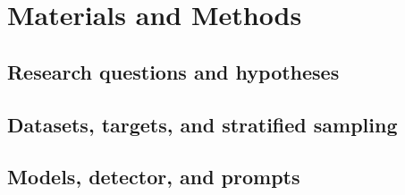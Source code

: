 \documentclass{elektr}
\begin{document}
\section*{Materials and Methods} \label{sec:methods}

\subsection*{Research questions and hypotheses}

\subsection*{Datasets, targets, and stratified sampling}

\subsection*{Models, detector, and prompts}
\end{document}
